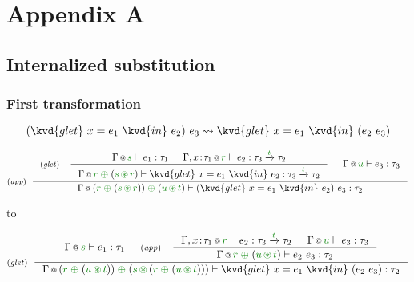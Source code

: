 
\chapter{Appendix A} 
\label{ch:appendix} 


\section{Internalized substitution}

\subsection{First transformation}

\begin{equation*}
(\kvd{glet}~x=e_1~\kvd{in}~e_2)~e_3 \leadsto \kvd{glet}~x=e_1~\kvd{in}~(e_2~e_3)
\end{equation*}

\begin{equation*}
\tyrule{app}
  { \tyrule{glet}
      { \coctx{\Gamma}{\cclrd{s}} \vdash e_1 : \tau_1 &
        \coctx{\Gamma, x\!:\!\tau_1}{\cclrd{r}} \vdash e_2 : \tau_3 \xrightarrow{\cclrd{t}} \tau_2 }
      { \coctx{\Gamma}{\cclrd{r}\;\cpar\;({\cclrd{s}\,\cseq\,\cclrd{r})}} \vdash \kvd{glet}~x=e_1~\kvd{in}~e_2 : \tau_3 \xrightarrow{\cclrd{t}} \tau_2 } &
    \coctx{\Gamma}{\cclrd{u}} \vdash e_3 : \tau_3  }
  { \coctx{\Gamma}{(\cclrd{r}\;\cpar\;(\cclrd{s}\,\cseq\,\cclrd{r})) \;\cpar\; (\cclrd{u}\,\cseq\,\cclrd{t}) } \vdash (\kvd{glet}~x=e_1~\kvd{in}~e_2)~e_3 : \tau_2 }
\end{equation*}

to

\begin{equation*}
\tyrule{glet}
  { \coctx{\Gamma}{\cclrd{s}} \vdash e_1 : \tau_1 &
    \tyrule{app}
      { \coctx{\Gamma, x\!:\!\tau_1}{\cclrd{r}} \vdash e_2 : \tau_3 \xrightarrow{\cclrd{t}} \tau_2 & 
        \coctx{\Gamma}{\cclrd{u}} \vdash e_3 : \tau_3 }
      { \coctx{\Gamma}{\cclrd{r}\;\cpar\;(\cclrd{u}\,\cseq\,\cclrd{t})} \vdash e_2~e_3 : \tau_2 } }
  { \coctx{\Gamma}{ (\cclrd{r}\;\cpar\;(\cclrd{u}\,\cseq\,\cclrd{t})) \;\cpar\; (\cclrd{s}\,\cseq\,(\cclrd{r}\;\cpar\;(\cclrd{u}\,\cseq\,\cclrd{t})))  }
      \vdash \kvd{glet}~x=e_1~\kvd{in}~(e_2~e_3) : \tau_2 }
\end{equation*}

